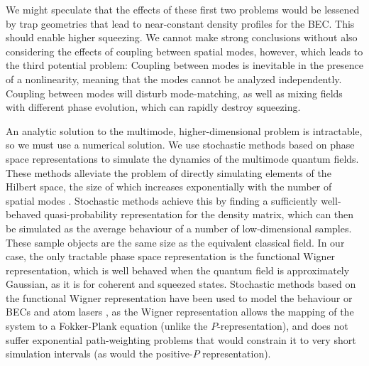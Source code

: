 \documentclass{iopart}
\begin{document}
We might speculate that the effects of these first two problems would be lessened by trap geometries that lead to near-constant density profiles for the BEC.  This should enable higher squeezing.  We cannot make strong conclusions without also considering the effects of coupling between spatial modes, however, which leads to the third potential problem: Coupling between modes is inevitable in the presence of a nonlinearity, meaning that the modes cannot be analyzed independently. Coupling between modes will disturb mode-matching, as well as mixing fields with different phase evolution, which can rapidly destroy squeezing.  

An analytic solution to the multimode, higher-dimensional problem is intractable, so we must use a numerical solution.  We use stochastic methods based on phase space representations to simulate the dynamics of the multimode quantum fields.  These methods alleviate the problem of directly simulating elements of the Hilbert space, the size of which increases exponentially with the number of spatial modes \cite{stochasticRefs}.  Stochastic methods achieve this by finding a sufficiently well-behaved quasi-probability representation for the density matrix, which can then be simulated as the average behaviour of a number of low-dimensional samples.  These sample objects are the same size as the equivalent classical field.  In our case, the only tractable phase space representation is the functional Wigner representation, which is well behaved when the quantum field is approximately Gaussian, as it is for coherent and squeezed states.  Stochastic methods based on the functional Wigner representation have been used to model the behaviour or BECs and atom lasers \cite{johnssonET2007,dallET2009,dennisET2010}, as the Wigner representation allows the mapping of the system to a Fokker-Plank equation (unlike the $P$-representation), and does not suffer exponential path-weighting problems that would constrain it to very short simulation intervals (as would the positive-$P$ representation).
\end{document}
